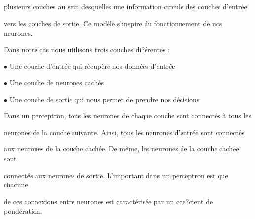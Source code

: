 \documentclass[a4paper,portrait,12pt]{article}
\begin{document}
\begin{flushleft}
plusieurs couches au sein desquelles une information circule des couches d'entr\'{e}e
\end{flushleft}


\begin{flushleft}
vers les couches de sortie. Ce mod\`{e}le s'inspire du fonctionnement de nos neurones.
\end{flushleft}


\begin{flushleft}
Dans notre cas nous utilisons trois couches di?\'{e}rentes :
\end{flushleft}


\begin{flushleft}
$\bullet$ Une couche d'entr\'{e}e qui r\'{e}cup\`{e}re nos donn\'{e}es d'entr\'{e}e
\end{flushleft}


\begin{flushleft}
$\bullet$ Une couche de neurones cach\'{e}s
\end{flushleft}


\begin{flushleft}
$\bullet$ Une couche de sortie qui nous permet de prendre nos d\'{e}cisions
\end{flushleft}





\begin{flushleft}
Dans un perceptron, tous les neurones de chaque couche sont connect\'{e}s \`{a} tous les
\end{flushleft}


\begin{flushleft}
neurones de la couche suivante. Ainsi, tous les neurones d'entr\'{e}e sont connect\'{e}s
\end{flushleft}


\begin{flushleft}
aux neurones de la couche cach\'{e}e. De m\^{e}me, les neurones de la couche cach\'{e}e sont
\end{flushleft}


\begin{flushleft}
connect\'{e}s aux neurones de sortie. L'important dans un perceptron est que chacune
\end{flushleft}


\begin{flushleft}
de ces connexions entre neurones est caract\'{e}ris\'{e}e par un coe?cient de pond\'{e}ration,
\end{flushleft}
\end{document}
